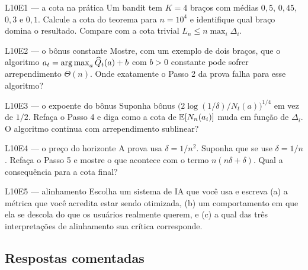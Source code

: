 \documentclass[11pt]{article}
\newcommand{\Qh}{\widehat{Q}}
\begin{document}
\begin{exbox}{L10E1 --- a cota na prática}
Um bandit tem $K=4$ braços com médias $0{,}5$, $0{,}45$, $0{,}3$ e $0{,}1$.
Calcule a cota do teorema para $n = 10^{4}$ e identifique qual braço domina o
resultado. Compare com a cota trivial $L_n \le n\max_i \Delta_i$.
\end{exbox}

\begin{exbox}{L10E2 --- o bônus constante}
Mostre, com um exemplo de dois braços, que o algoritmo
$a_t = \argmax_a \Qh_t(a) + b$ com $b>0$ constante pode sofrer arrependimento
$\Theta(n)$. Onde exatamente o Passo 2 da prova falha para esse algoritmo?
\end{exbox}

\begin{exbox}{L10E3 --- o expoente do bônus}
Suponha bônus $\bigl(2\log(1/\delta)/N_t(a)\bigr)^{1/4}$ em vez de $1/2$.
Refaça o Passo 4 e diga como a cota de $\mathbb{E}[N_n(a_i)]$ muda em função de
$\Delta_i$. O algoritmo continua com arrependimento sublinear?
\end{exbox}

\begin{exbox}{L10E4 --- o preço do horizonte}
A prova usa $\delta = 1/n^{2}$. Suponha que se use $\delta = 1/n$. Refaça o
Passo 5 e mostre o que acontece com o termo $n(n\delta + \delta)$. Qual a
consequência para a cota final?
\end{exbox}

\begin{exbox}{L10E5 --- alinhamento}
Escolha um sistema de IA que você usa e escreva (a) a métrica que você acredita
estar sendo otimizada, (b) um comportamento em que ela se descola do que os
usuários realmente querem, e (c) a qual das três interpretações de alinhamento
sua crítica corresponde.
\end{exbox}

\subsection*{Respostas comentadas}
\end{document}
